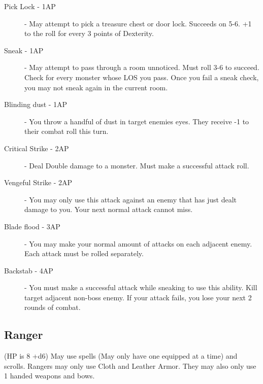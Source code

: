 \documentclass[a6paper,hidelinks]{article}
\begin{document}
\begin{description}

\item[Pick Lock - 1AP] - May attempt to pick a treasure chest or door lock. Succeeds on 5-6. +1 to the roll for every 3 points of Dexterity.

\item[Sneak - 1AP] - May attempt to pass through a room unnoticed. Must roll 3-6 to succeed. Check for every monster whose LOS you pass. Once you fail a sneak check, you may not sneak again in the current room.

\item[Blinding dust - 1AP] - You throw a handful of dust in target enemies eyes. They receive -1 to their combat roll this turn.

\item[Critical Strike - 2AP] - Deal Double damage to a monster. Must make a successful attack roll.

\item[Vengeful Strike - 2AP] - You may only use this attack against an enemy that has just dealt damage to you. Your next normal attack cannot miss.

\item[Blade flood - 3AP] - You may make your normal amount of attacks on each adjacent enemy. Each attack must be rolled separately.

\item[Backstab - 4AP] - You must make a successful attack while sneaking to use this ability. Kill target adjacent non-boss enemy. If your attack fails, you lose your next 2 rounds of combat.

\end{description}

\subsection{Ranger}

(HP is 8 +d6) May use spells (May only have one equipped at a time) and scrolls. Rangers may only use Cloth and Leather Armor. They may also only
use 1 handed weapons and bows.
\end{document}
